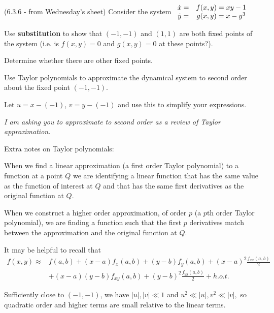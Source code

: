 \documentclass[12pt,letterpaper,noanswers]{exam}
\begin{document}
\begin{questions}


\item (6.3.6 - from Wednesday's sheet) Consider the system
$\displaystyle\begin{array}{c c c}
 \dot{x} = & f(x,y) = x y - 1 \\
 \dot{y} = & g(x,y) = x - y^3
\end{array}$
 \begin{parts}
 \item Use \textbf{substitution} to show that $(-1,-1)$ and $(1,1)$ are both fixed points of the system (i.e. is $f(x,y) = 0$ and $g(x,y) = 0$ at these points?).  
 
 Determine whether there are other fixed points.
 \item Use Taylor polynomials to approximate the dynamical system to second order about the fixed point $(-1, -1)$.  
 
 Let $u = x-(-1)$, $v = y - (-1)$ and use this to simplify your expressions.
 
 \emph{I am asking you to approximate to second order as a review of Taylor approximation.}
 
 \begin{tcolorbox}
 
 Extra notes on Taylor polynomials:
 
 When we find a linear approximation (a first order Taylor polynomial) to a function at a point $Q$ we are identifying a linear function that has the same value as the function of interest at $Q$ and that has the same first derivatives as the original function at $Q$.
 
 When we construct a higher order approximation, of order $p$  (a $p$th order Taylor polynomial), we are finding a function such that the first $p$ derivatives match between the approximation and the original function at $Q$.
 
It may be helpful to recall that
 \begin{align*} 
 f(x,y) \approx& f(a,b) + (x-a)f_x(a,b) + (y-b) f_y(a,b) + (x-a)^2\frac{f_{xx}(a,b)}{2}\\
 &+(x-a)(y-b)f_{xy}(a,b) + (y-b)^2\frac{f_{yy}(a,b)}{2} + h.o.t.
 \end{align*}

\end{tcolorbox}
\item Sufficiently close to $(-1,-1)$, we have $\vert u \vert, \vert v\vert \ll 1$ and $u^2 \ll \vert u \vert, v^2 \ll \vert v \vert,$ so quadratic order and higher terms are small relative to the linear terms.  


\end{parts}
\end{questions}
\end{document}
